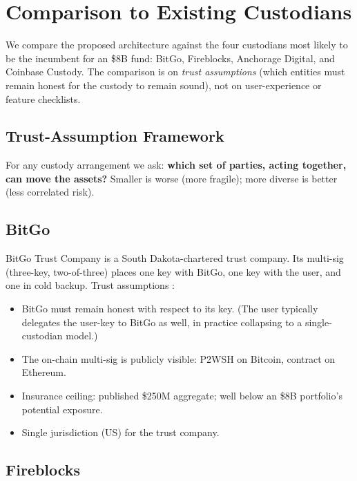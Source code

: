 \section{Comparison to Existing Custodians}

\label{sec:compare}

We compare the proposed architecture against the four custodians
most likely to be the incumbent for an \$8B fund: BitGo, Fireblocks,
Anchorage Digital, and Coinbase Custody. The comparison is on
\emph{trust assumptions} (which entities must remain honest for the
custody to remain sound), not on user-experience or feature checklists.

\subsection{Trust-Assumption Framework}

For any custody arrangement we ask: \textbf{which set of parties,
acting together, can move the assets?} Smaller is worse (more
fragile); more diverse is better (less correlated risk).

\subsection{BitGo}

BitGo Trust Company is a South Dakota-chartered trust company. Its
multi-sig (three-key, two-of-three) places one key with BitGo, one
key with the user, and one in cold backup. Trust assumptions
\cite{bitgo-soc}:

\begin{itemize}[nosep]
\item BitGo must remain honest with respect to its key. (The user
typically delegates the user-key to BitGo as well, in practice
collapsing to a single-custodian model.)
\item The on-chain multi-sig is publicly visible: P2WSH on Bitcoin,
contract on Ethereum.
\item Insurance ceiling: published \$250M aggregate; well below an
\$8B portfolio's potential exposure.
\item Single jurisdiction (US) for the trust company.
\end{itemize}

\subsection{Fireblocks}

